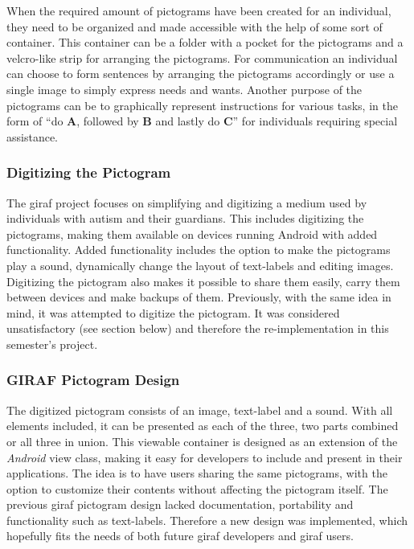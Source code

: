 When the required amount of pictograms have been created for an individual, they need to be organized and made accessible with the help of some sort of container. This container can be a folder with a pocket for the pictograms and a velcro-like strip for arranging the pictograms. For communication an individual can choose to form sentences by arranging the pictograms accordingly or use a single image to simply express needs and wants. Another purpose of the pictograms can be to graphically represent instructions for various tasks, in the form of ``do \textbf{A}, followed by \textbf{B} and lastly do \textbf{C}'' for individuals requiring special assistance.

\subsubsection*{Digitizing the Pictogram}
The \ac{giraf} project focuses on simplifying and digitizing a medium used by individuals with autism and their guardians. This includes digitizing the pictograms, making them available on devices running Android with added functionality. Added functionality includes the option to make the pictograms play a sound, dynamically change the layout of text-labels and editing images. Digitizing the pictogram also makes it possible to share them easily, carry them between devices and make backups of them. Previously, with the same idea in mind, it was attempted to digitize the pictogram. It was considered unsatisfactory (see section below) and therefore the re-implementation in this semester's project.

\subsubsection*{GIRAF Pictogram Design}
The digitized pictogram consists of an image, text-label and a sound. With all elements included, it can be presented as each of the three, two parts combined or all three in union. This viewable container is designed as an extension of the \emph{Android} view class, making it easy for developers to include and present in their applications. The idea is to have users sharing the same pictograms, with the option to customize their contents without affecting the pictogram itself. The previous \ac{giraf} pictogram design lacked documentation, portability and functionality such as text-labels. Therefore a new design was implemented, which hopefully fits the needs of both future \ac{giraf} developers and \ac{giraf} users.
